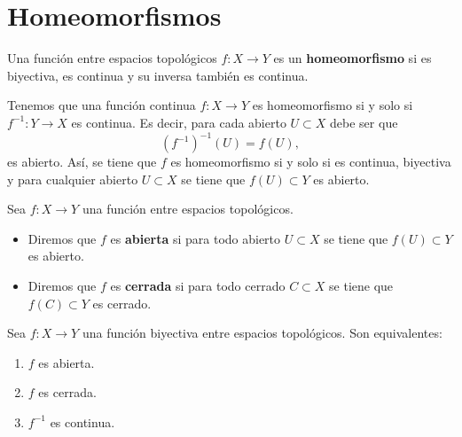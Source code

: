 \section{Homeomorfismos}
\begin{definition}[Homeomorfismo]
Una función entre espacios topológicos $\displaystyle f : X \to Y $ es un \textbf{homeomorfismo} si es biyectiva, es continua y su inversa también es continua.
\end{definition}
\begin{observation}
	Tenemos que una función continua $\displaystyle f : X \to Y $ es homeomorfismo si y solo si $\displaystyle f^{-1} : Y \to X $ es continua. Es decir, para cada abierto $\displaystyle U \subset X $ debe ser que 
	\[\left(f^{-1}\right)^{-1}\left(U\right)=f\left(U\right) ,\]
	es abierto. Así, se tiene que $\displaystyle f $ es homeomorfismo si y solo si es continua, biyectiva y para cualquier abierto $\displaystyle U \subset X $ se tiene que $\displaystyle f\left(U\right) \subset Y$ es abierto. 
\end{observation}
\begin{definition}
	Sea $\displaystyle f : X \to Y $ una función entre espacios topológicos.
	\begin{itemize}
	\item Diremos que $\displaystyle f $ es \textbf{abierta} si para todo abierto $\displaystyle U \subset X $ se tiene que $\displaystyle f\left(U\right)\subset Y $ es abierto. 
	\item Diremos que $\displaystyle f $ es \textbf{cerrada} si para todo cerrado $\displaystyle C \subset X $ se tiene que $\displaystyle f\left(C\right)\subset Y $ es cerrado. 
	\end{itemize}
\end{definition}
\begin{prop}
Sea $\displaystyle f : X \to Y $ una función biyectiva entre espacios topológicos. Son equivalentes:
\begin{enumerate}
\item $\displaystyle f $ es abierta. 
\item $\displaystyle f $ es cerrada.
\item $\displaystyle f^{-1} $ es continua.
\end{enumerate}
\end{prop}
